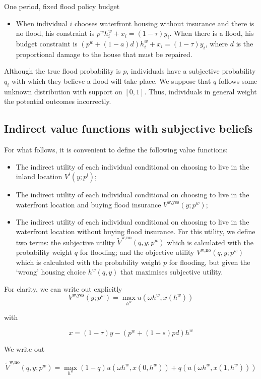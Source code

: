 \documentclass{article}
\begin{document}
\begin{section}{One period, fixed flood policy budget}
\begin{itemize}
\item When individual $i$ chooses waterfront housing without insurance and there is no flood, his constraint is $p^wh^w_i+x_i=(1-\tau)y_i$. When there is a flood, his budget constraint is $(p^w+(1-a)d)h^w_i+x_i=(1-\tau)y_i$, where $d$ is the proportional damage to the house that must be repaired. 

\end{itemize}

Although the true flood probability is $p$, individuals have a subjective probability $q_i$ with which they believe a flood will take place. We suppose that $q$ follows some unknown distribution with support on $[0,1]$. Thus, individuals in general weight the potential outcomes incorrectly.

\subsection{Indirect value functions with subjective beliefs}
For what follows, it is convenient to define the following value functions:

\begin{itemize}
\item The indirect utility of each individual conditional on choosing to live in the inland location $V^{l}(y;p^l)$;
\item The indirect utility of each individual conditional on choosing to live in the waterfront location and buying flood insurance $V^{\text{w,yes}}(y;p^w)$;
\item The indirect utility of each individual conditional on choosing to live in the waterfront location without buying flood insurance. For this utility, we define two terms: the subjective utility $\tilde{V}^{\text{w,no}}(q,y;p^w)$ which is calculated with the probability weight $q$ for flooding; and the objective utility $V^{\text{w,no}}(q,y;p^w)$ which is calculated with the probability weight $p$ for flooding, but given the `wrong' housing choice $h^w(q,y)$ that maximises subjective utility.
\end{itemize}


For clarity, we can write out explicitly
\[V^\text{w,yes}(y;p^w)=
\max_{h^w} u(\omega h^w, x(h^w))
\]

with 

\[
x=(1-\tau)y-(p^w+(1-s)pd)h^w
\]



We write out

\[\tilde{V}^\text{w,no}(q,y;p^w)=
\max_{h^w} (1-q) u(\omega h^w,x(0,h^w)) + q (u(\omega h^w, x(1,h^w)))
\]


\end{section}
\end{document}
